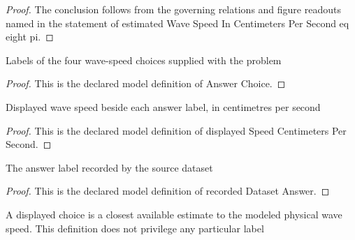 \begin{proof}
  The conclusion follows from the governing relations and figure readouts named in the statement of estimated Wave Speed In Centimeters Per Second eq eight pi.
\end{proof}
\begin{definition}
  \label{def:physics:phyx-mini-0206:phyxminiproblems-problemphyxmini0206-answerchoice}
  Labels of the four wave-speed choices supplied with the problem
\end{definition}
\begin{proof}
  This is the declared model definition of Answer Choice.
\end{proof}
\begin{definition}
  \label{def:physics:phyx-mini-0206:phyxminiproblems-problemphyxmini0206-displayedspeedcentimeterspersecond}
  Displayed wave speed beside each answer label, in centimetres per second
\end{definition}
\begin{proof}
  This is the declared model definition of displayed Speed Centimeters Per Second.
\end{proof}
\begin{definition}
  \label{def:physics:phyx-mini-0206:phyxminiproblems-problemphyxmini0206-recordeddatasetanswer}
  The answer label recorded by the source dataset
\end{definition}
\begin{proof}
  This is the declared model definition of recorded Dataset Answer.
\end{proof}
\begin{definition}
  \label{def:physics:phyx-mini-0206:phyxminiproblems-problemphyxmini0206-isclosestdisplayedspeedestimate}
  A displayed choice is a closest available estimate to the modeled physical wave speed. This definition does not privilege any particular label
\end{definition}
